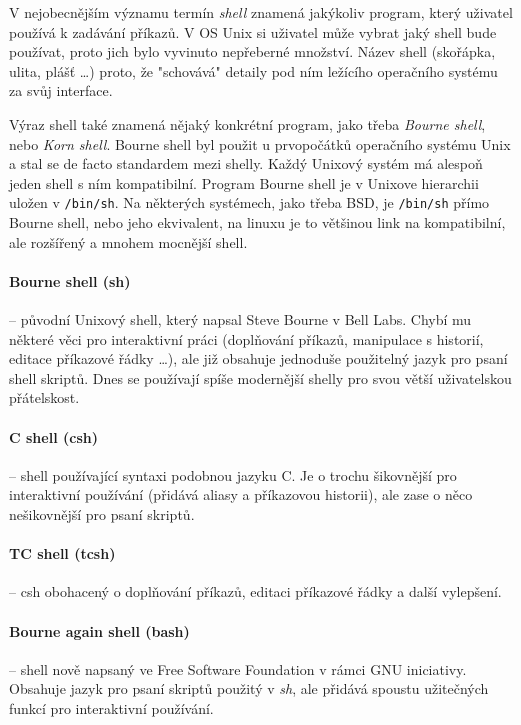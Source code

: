 V nejobecnějším významu termín \emph{shell} znamená jakýkoliv program, který
uživatel používá k zadávání příkazů. V OS Unix si uživatel může vybrat jaký
shell bude používat, proto jich bylo vyvinuto nepřeberné množství. Název shell
(skořápka, ulita, plášť \dots) proto, že "schovává" detaily pod ním ležícího
operačního systému za svůj interface.

Výraz shell také znamená nějaký konkrétní program, jako třeba \emph{Bourne
shell}, nebo \emph{Korn shell}. Bourne shell byl použit u prvopočátků operačního
systému Unix a stal se de facto standardem mezi shelly. Každý Unixový systém má
alespoň jeden shell s ním kompatibilní. Program Bourne shell je v Unixove
hierarchii uložen v \texttt{/bin/sh}. Na některých systémech, jako třeba BSD, je
\texttt{/bin/sh} přímo Bourne shell, nebo jeho ekvivalent, na linuxu je to
většinou link na kompatibilní, ale rozšířený a mnohem mocnější shell.

\paragraph{Bourne shell (sh)} -- původní Unixový shell, který napsal Steve
Bourne v Bell Labs. Chybí mu některé věci pro interaktivní práci (doplňování
příkazů, manipulace s historií, editace příkazové řádky \dots), ale již obsahuje
jednoduše použitelný jazyk pro psaní shell skriptů. Dnes se používají spíše
modernější shelly pro svou větší uživatelskou přátelskost.

\paragraph{C shell (csh)} -- shell používající syntaxi podobnou jazyku C. Je o
trochu šikovnější pro interaktivní používání (přidává aliasy a příkazovou
historii), ale zase o něco nešikovnější pro psaní skriptů.

\paragraph{TC shell (tcsh)} -- csh obohacený o doplňování příkazů, editaci
příkazové řádky a další vylepšení.

\paragraph{Bourne again shell (bash)} -- shell nově napsaný ve Free Software
Foundation v rámci GNU iniciativy. Obsahuje jazyk pro psaní skriptů použitý v
\emph{sh}, ale přidává spoustu užitečných funkcí pro interaktivní používání.

